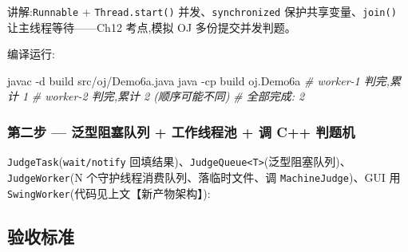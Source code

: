 \documentclass[
  11pt,
]{ctexart}
\newenvironment{Shaded}{\begin{snugshade}}{\end{snugshade}}
\newcommand{\AttributeTok}[1]{\textcolor[rgb]{0.13,0.29,0.53}{#1}}
\newcommand{\BuiltInTok}[1]{#1}
\newcommand{\CommentTok}[1]{\textcolor[rgb]{0.56,0.35,0.01}{\textit{#1}}}
\newcommand{\ExtensionTok}[1]{#1}
\newcommand{\FunctionTok}[1]{\textcolor[rgb]{0.13,0.29,0.53}{\textbf{#1}}}
\newcommand{\KeywordTok}[1]{\textcolor[rgb]{0.13,0.29,0.53}{\textbf{#1}}}
\newcommand{\NormalTok}[1]{#1}
\newcommand{\OperatorTok}[1]{\textcolor[rgb]{0.81,0.36,0.00}{\textbf{#1}}}
\newcommand{\StringTok}[1]{\textcolor[rgb]{0.31,0.60,0.02}{#1}}
\newcommand{\VariableTok}[1]{\textcolor[rgb]{0.00,0.00,0.00}{#1}}
\begin{document}
讲解:\texttt{Runnable} + \texttt{Thread.start()}
并发、\texttt{synchronized} 保护共享变量、\texttt{join()}
让主线程等待------Ch12 考点,模拟 OJ 多份提交并发判题。

编译运行:

\begin{Shaded}
\begin{Highlighting}[]
\ExtensionTok{javac} \AttributeTok{{-}d}\NormalTok{ build src/oj/Demo6a.java}
\ExtensionTok{java} \AttributeTok{{-}cp}\NormalTok{ build oj.Demo6a}
\CommentTok{\# worker{-}1 判完,累计 1}
\CommentTok{\# worker{-}2 判完,累计 2   (顺序可能不同)}
\CommentTok{\# 全部完成: 2}
\end{Highlighting}
\end{Shaded}

\hypertarget{ux7b2cux4e8cux6b65-ux6cdbux578bux963bux585eux961fux5217-ux5de5ux4f5cux7ebfux7a0bux6c60-ux8c03-c-ux5224ux9898ux673a}{%
\subsubsection{\texorpdfstring{第二步 \GC --- 泛型阻塞队列 + 工作线程池
+ 调 C++
判题机}{第二步 --- 泛型阻塞队列 + 工作线程池 + 调 C++ 判题机}}\label{ux7b2cux4e8cux6b65-ux6cdbux578bux963bux585eux961fux5217-ux5de5ux4f5cux7ebfux7a0bux6c60-ux8c03-c-ux5224ux9898ux673a}}

\texttt{JudgeTask}(\texttt{wait/notify}
回填结果)、\texttt{JudgeQueue\textless{}T\textgreater{}}(泛型阻塞队列)、\texttt{JudgeWorker}(N
个守护线程消费队列、落临时文件、调 \texttt{MachineJudge})、GUI 用
\texttt{SwingWorker}(代码见上文【新产物架构】):

\begin{Shaded}
\end{Shaded}

\hypertarget{ux9a8cux6536ux6807ux51c6-8}{%
\subsection{验收标准}\label{ux9a8cux6536ux6807ux51c6-8}}
\end{document}
